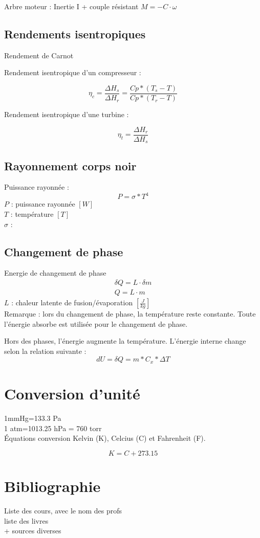 	Arbre moteur : Inertie I + couple résistant $M= -C \cdot \omega$
	\subsection{Rendements isentropiques}
	
	Rendement de Carnot
	
	Rendement isentropique d'un compresseur :
	
	\begin{equation}
	\eta_c=\frac{\Delta H_s}{\Delta H_r}=\frac{Cp*(T_s-T)}{Cp*(T_r-T)}
	\end{equation}
	
	Rendement isentropique d'une turbine :
	
	\begin{equation}
	\eta_t=\frac{\Delta H_r}{\Delta H_s}
	\end{equation}
	
	\subsection{Rayonnement corps noir}
	Puissance rayonnée :
	\begin{equation}
	P= \sigma * T^4
	\end{equation}
	$P$ : puissance rayonnée $[W]$\\
	$T$ : température $[T]$\\
	$\sigma$ : 
	
	\subsection{Changement de phase}
	Energie de changement de phase
	\begin{eqnarray}
	\delta Q=L \cdot \delta m\\
	Q=L \cdot m
	\end{eqnarray}
	$L$ : chaleur latente de fusion/évaporation $[\frac{J}{kg}]$\\
	Remarque : lors du changement de phase, la température reste constante. Toute l'énergie absorbe est utilisée pour le changement de phase.
	
	Hors des phases, l'énergie augmente la température. L'énergie interne change selon la relation suivante : 
	\begin{equation}
	dU=\delta Q=m*C_x*\Delta T
	\end{equation}
	
	
	
	
	\newpage
	\section{Conversion d'unité}
	
	1mmHg=133.3 Pa\\
	1 atm=1013.25 hPa = 760 torr\\
	
	Équations conversion Kelvin (K), Celcius (C) et Fahrenheit (F).
	
	\begin{equation}
	K=C+273.15
	\end{equation}
	
	
	\newpage
	\section{Bibliographie}
	Liste des cours, avec le nom des profs\\
	liste des livres\\
	+ sources diverses

